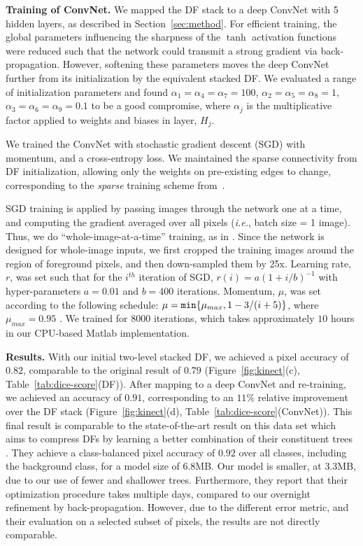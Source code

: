\documentclass[twocolumn]{svjour3}
\begin{document}
\textbf{Training of ConvNet. } 
We mapped the DF stack to a deep ConvNet with 5 hidden layers, as described in Section~\ref{sec:method}. For efficient training, the global parameters influencing the sharpness of the $\tanh$ activation functions were reduced such that the network could transmit a strong gradient via back-propagation. However, softening these parameters moves the deep ConvNet further from its initialization by the equivalent stacked DF. We evaluated a range of initialization parameters and found
$\alpha_1=\alpha_{4}=\alpha_{7}=100$, $\alpha_{2}=\alpha_{5}=\alpha_{8}=1$, $\alpha_{3}=\alpha_{6}=\alpha_{9}=0.1$ to be a good compromise, where $\alpha_{j}$ is the multiplicative factor applied to weights and biases in layer, $H_j$.

We trained the ConvNet with stochastic gradient descent (SGD) with momentum, and a cross-entropy loss.
We maintained the sparse connectivity from DF initialization, allowing only the weights on pre-existing edges to change, corresponding to the \textit{sparse} training scheme from~\cite{Welbl14}.

SGD training is applied by passing images through the network one at a time, and computing the gradient averaged over all pixels (\emph{i.e.}, batch size = 1 image).
Thus, we do ``whole-image-at-a-time'' training, as in \cite{long_shelhamer_fcn_2015}.
Since the network is designed for whole-image inputs, we first cropped the training images around the region of foreground pixels, and then down-sampled them by 25x.
Learning rate, $r$, was set such that for the $i^{th}$ iteration of SGD, $r(i) = a(1 + i/b)^{-1}$ with hyper-parameters $a = 0.01$ and $b = 400$ iterations.
Momentum, $\mu$, was set according to the following schedule: $\mu =\nobreak \mathtt{min} \{ \mu_{max}, 1 - 3 / (i + 5) \}$, where $\mu_{max} = 0.95$ \cite{sutskever}.
We trained for 8000 iterations, which takes approximately $10$ hours in our CPU-based Matlab implementation.

\textbf{Results. }
With our initial two-level stacked DF, we achieved a pixel accuracy of $0.82$, comparable to the original result of $0.79$ \cite{denil} (Figure~\ref{fig:kinect}(c), Table~\ref{tab:dice-score}(DF)).
After mapping to a deep ConvNet and re-training, we achieved an accuracy of $0.91$, corresponding to an $11\%$ relative improvement over the DF stack (Figure~\ref{fig:kinect}(d), Table~\ref{tab:dice-score}(ConvNet)).
This final result is comparable to the state-of-the-art result on this data set which aims to compress DFs by learning a better combination of their constituent trees \cite{shaoqing15grrf}.
They achieve a class-balanced pixel accuracy of $0.92$ over all classes, including the background class, for a model size of 6.8MB. Our model is smaller, at 3.3MB, due to our use of fewer and shallower trees.
Furthermore, they report that their optimization procedure takes multiple days, compared to our overnight refinement by back-propagation.
However, due to the different error metric, and their evaluation on a selected subset of pixels, the results are not directly comparable.
\end{document}

